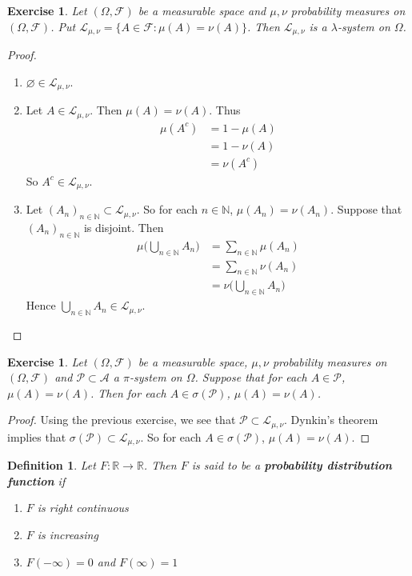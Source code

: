 \documentclass[12pt]{amsart}
\newtheorem{defn}[thm]{Definition}
\newtheorem{ex}[thm]{Exercise}
\newcommand{\lam}{\lambda}
\newcommand{\sig}{\sigma}
\newcommand{\Om}{\Omega}
\newcommand{\N}{\mathbb{N}}
\newcommand{\R}{\mathbb{R}}
\newcommand{\MA}{\mathcal{A}}
\newcommand{\MF}{\mathcal{F}}
\newcommand{\ML}{\mathcal{L}}
\newcommand{\MP}{\mathcal{P}}
\begin{document}
	\begin{ex}
		Let $(\Om, \MF)$ be a measurable space and $\mu, \nu$ probability measures on $(\Om, \MF)$. Put $\ML_{\mu,\nu} = \{A \in \MF: \mu(A) = \nu(A)\}$. Then $\ML_{\mu, \nu}$ is a $\lam$-system on $\Om$.
	\end{ex}
	
	\begin{proof}\
		\begin{enumerate}
			\item $\varnothing \in \ML_{\mu, \nu}$.
			\item Let $A \in \ML_{\mu, \nu}$. Then $\mu(A) = \nu(A)$. Thus 
			\begin{align*}
				\mu(A^c) 
				&= 1-\mu(A) \\
				&= 1 -\nu(A) \\
				&= \nu(A^c)
			\end{align*}
			So $A^c \in \ML_{\mu, \nu}$. 
			\item Let $(A_n)_{n \in \N} \subset \ML_{\mu, \nu}$. So for each $n \in \N$, $\mu(A_n) = \nu(A_n)$.  Suppose that $(A_n)_{n \in \N}$ is disjoint. Then 
			\begin{align*}
				\mu\bigg(\bigcup_{n \in \N} A_n\bigg) 
				&= \sum_{n \in \N} \mu(A_n) \\
				&= \sum_{n \in \N} \nu(A_n) \\
				&= \nu\bigg(\bigcup_{n \in \N} A_n\bigg) 
			\end{align*}
			Hence $\bigcup_{n \in \N} A_n \in \ML_{\mu, \nu}$.
		\end{enumerate}
	\end{proof}
	
	\begin{ex}
		Let $(\Om, \MF)$ be a measurable space, $\mu, \nu$ probability measures on $(\Om, \MF)$ and $\MP \subset \MA$ a $\pi$-system on $\Om$. Suppose that for each $A \in \MP$, $\mu(A) = \nu(A)$. Then for each $A \in \sig(\MP)$, $\mu(A) = \nu(A)$.
	\end{ex}
	
	\begin{proof}
		Using the previous exercise, we see that $\MP \subset \ML_{\mu, \nu}$. Dynkin's theorem implies that $\sig(\MP) \subset \ML_{\mu, \nu}$. So for each $A \in \sig(\MP)$, $\mu(A) = \nu(A)$.
	\end{proof}
	
	
	
	
	
	
	
	
	\begin{defn}
		Let $F: \R \rightarrow \R$. Then $F$ is said to be a \textbf{probability distribution function} if 
		\begin{enumerate}
			\item $F$ is right continuous
			\item $F$ is increasing
			\item $F(-\infty)  = 0$ and $F(\infty)  = 1$
		\end{enumerate}
	\end{defn}
	
\end{document}

